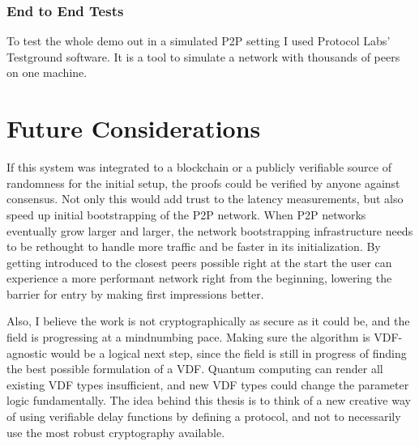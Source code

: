 \subsection{End to End Tests}
To test the whole demo out in a simulated P2P setting I used Protocol Labs' Testground software. It is a tool to simulate a network with thousands of peers on one machine.

\chapter{Future Considerations}
\label{Future Considerations}
If this system was integrated to a blockchain or a publicly verifiable source of randomness for the initial setup, the proofs could be verified by anyone against consensus. Not only this would add trust to the latency measurements, but also speed up initial bootstrapping of the P2P network. When P2P networks eventually grow larger and larger, the network bootstrapping infrastructure needs to be rethought to handle more traffic and be faster in its initialization. By getting introduced to the closest peers possible right at the start the user can experience a more performant network right from the beginning, lowering the barrier for entry by making first impressions better. 

Also, I believe the work is not cryptographically as secure as it could be, and the field is progressing at a mindnumbing pace. Making sure the algorithm is VDF-agnostic would be a logical next step, since the field is still in progress of finding the best possible formulation of a VDF. Quantum computing can render all existing VDF types insufficient, and new VDF types could change the parameter logic fundamentally. The idea behind this thesis is to think of a new creative way of using verifiable delay functions by defining a protocol, and not to necessarily use the most robust cryptography available. 

